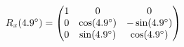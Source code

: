 \documentclass[preview]{standalone}
\begin{document}
\begin{align*}
\special{dvisvgm:raw <g id='unique000'>}R_x(4.9^\circ) = \begin{pmatrix} 1 & 0 & 0 \\ 0 & \cos(4.9^\circ) & -\sin(4.9^\circ) \\ 0 & \sin(4.9^\circ) & \cos(4.9^\circ) \end{pmatrix}\special{dvisvgm:raw </g>}
\end{align*}
\end{document}
